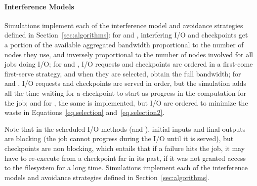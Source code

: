 
\ifTR

\paragraph*{Interference Models} Simulations implement each of the
interference model and avoidance strategies defined in
Section~\ref{sec:algorithms}: for \propfixed and \propdaly,
interfering I/O and checkpoints get a portion of the available
aggregated bandwidth proportional to the number of nodes they use, and
inversely proportional to the number of nodes involved for all
jobs doing I/O; for \bfifofixed and \bfifodaly, I/O requests
and checkpoints are ordered in a first-come first-serve strategy, and
when they are selected, obtain the full bandwidth; for \fifofixed and
\fifodaly, I/O requests and checkpoints are served in order, but the
simulation adds all the time waiting for a checkpoint to start as
progress in the computation for the job; and for \cooperative,
the same is implemented, but I/O are ordered to minimize the waste in
Equations~\eqref{eq.selection} and~\eqref{eq.selection2}.


Note that in the scheduled I/O methods (\fifononblock and \cooperative),
initial inputs and final outputs are blocking (the job
cannot progress during the I/O until it is served), but checkpoints
are non blocking, which entails that if a failure hits the job,
it may have to re-execute from a checkpoint far in its past, if it was not
granted access to the filesystem for a long time.
\else
Simulations implement each of the interference models and avoidance
strategies defined in Section~\ref{sec:algorithms}.
\fi

